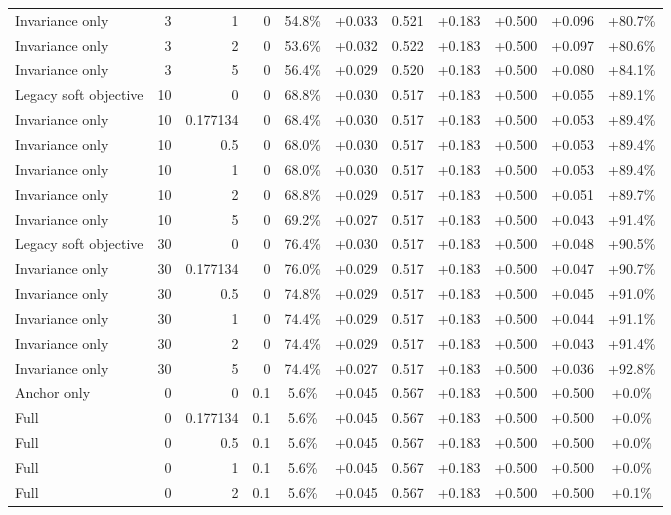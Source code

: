 \begin{table}[htbp]
\begin{tabular}{lrrrccccccc}
Invariance only & 3 & 1 & 0 & 54.8\% & +0.033 & 0.521 & +0.183 & +0.500 & +0.096 & +80.7\% \\
Invariance only & 3 & 2 & 0 & 53.6\% & +0.032 & 0.522 & +0.183 & +0.500 & +0.097 & +80.6\% \\
Invariance only & 3 & 5 & 0 & 56.4\% & +0.029 & 0.520 & +0.183 & +0.500 & +0.080 & +84.1\% \\
Legacy soft objective & 10 & 0 & 0 & 68.8\% & +0.030 & 0.517 & +0.183 & +0.500 & +0.055 & +89.1\% \\
Invariance only & 10 & 0.177134 & 0 & 68.4\% & +0.030 & 0.517 & +0.183 & +0.500 & +0.053 & +89.4\% \\
Invariance only & 10 & 0.5 & 0 & 68.0\% & +0.030 & 0.517 & +0.183 & +0.500 & +0.053 & +89.4\% \\
Invariance only & 10 & 1 & 0 & 68.0\% & +0.030 & 0.517 & +0.183 & +0.500 & +0.053 & +89.4\% \\
Invariance only & 10 & 2 & 0 & 68.8\% & +0.029 & 0.517 & +0.183 & +0.500 & +0.051 & +89.7\% \\
Invariance only & 10 & 5 & 0 & 69.2\% & +0.027 & 0.517 & +0.183 & +0.500 & +0.043 & +91.4\% \\
Legacy soft objective & 30 & 0 & 0 & 76.4\% & +0.030 & 0.517 & +0.183 & +0.500 & +0.048 & +90.5\% \\
Invariance only & 30 & 0.177134 & 0 & 76.0\% & +0.029 & 0.517 & +0.183 & +0.500 & +0.047 & +90.7\% \\
Invariance only & 30 & 0.5 & 0 & 74.8\% & +0.029 & 0.517 & +0.183 & +0.500 & +0.045 & +91.0\% \\
Invariance only & 30 & 1 & 0 & 74.4\% & +0.029 & 0.517 & +0.183 & +0.500 & +0.044 & +91.1\% \\
Invariance only & 30 & 2 & 0 & 74.4\% & +0.029 & 0.517 & +0.183 & +0.500 & +0.043 & +91.4\% \\
Invariance only & 30 & 5 & 0 & 74.4\% & +0.027 & 0.517 & +0.183 & +0.500 & +0.036 & +92.8\% \\
Anchor only & 0 & 0 & 0.1 & 5.6\% & +0.045 & 0.567 & +0.183 & +0.500 & +0.500 & +0.0\% \\
Full & 0 & 0.177134 & 0.1 & 5.6\% & +0.045 & 0.567 & +0.183 & +0.500 & +0.500 & +0.0\% \\
Full & 0 & 0.5 & 0.1 & 5.6\% & +0.045 & 0.567 & +0.183 & +0.500 & +0.500 & +0.0\% \\
Full & 0 & 1 & 0.1 & 5.6\% & +0.045 & 0.567 & +0.183 & +0.500 & +0.500 & +0.0\% \\
Full & 0 & 2 & 0.1 & 5.6\% & +0.045 & 0.567 & +0.183 & +0.500 & +0.500 & +0.1\% \\

\end{tabular}
\end{table}
